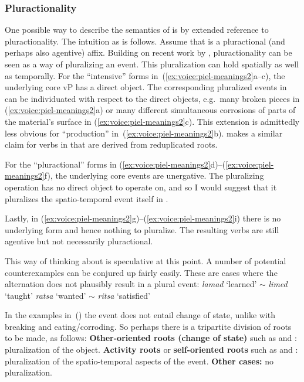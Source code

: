 {		\subsubsection{Pluractionality} \label{voice:va:sem:plural}
One possible way to describe the semantics of {\va} is by extended reference to pluractionality. The intuition as is follows. Assume that {\va} is a pluractional (and perhaps also agentive) affix. Building on recent work by \cite{henderson12phd,henderson17nllt}, pluractionality can be seen as a way of pluralizing an event. This pluralization can hold spatially as well as temporally. For the ``intensive'' forms in~(\ref{ex:voice:piel-meanings2}a--c), the underlying core vP has a direct object. The corresponding pluralized events in {\tpie} can be individuated with respect to the direct objects, e.g.~many broken pieces in (\ref{ex:voice:piel-meanings2}a) or many different simultaneous corrosions of parts of the material's surface in (\ref{ex:voice:piel-meanings2}c). This extension is admittedly less obvious for ``production'' in~(\ref{ex:voice:piel-meanings2}b). \cite{greenberg10} makes a similar claim for verbs in {\tpie} that are derived from reduplicated roots.

For the ``pluractional'' forms in (\ref{ex:voice:piel-meanings2}d)--(\ref{ex:voice:piel-meanings2}f), the underlying core events are unergative. The pluralizing operation has no direct object to operate on, and so I would suggest that it pluralizes the spatio-temporal event itself in {\tpie}.

Lastly, in (\ref{ex:voice:piel-meanings2}g)--(\ref{ex:voice:piel-meanings2}i) there is no underlying form and hence nothing to pluralize. The resulting verbs are still agentive but not necessarily pluractional.

This way of thinking about {\tpie} is speculative at this point. A number of potential counterexamples can be conjured up fairly easily. These are cases where the alternation does not plausibly result in a plural event:
\pex
	\a \emph{lamad} `learned' $\sim$ \emph{limed} `taught'
	\a \emph{ratsa} `wanted' $\sim$ \emph{ritsa} `satisfied'
\xe

In the examples in~(\lastx) the event does not entail change of state, unlike with breaking and eating/corroding. So perhaps there is a tripartite division of roots to be made, as follows:
\pex
	\a \textbf{Other-oriented roots (change of state)} such as  and : pluralization of the object.
	\a \textbf{Activity roots} or \textbf{self-oriented roots} such as  and : pluralization of the spatio-temporal aspects of the event.
	\a \textbf{Other cases:} no pluralization.
\xe

}
